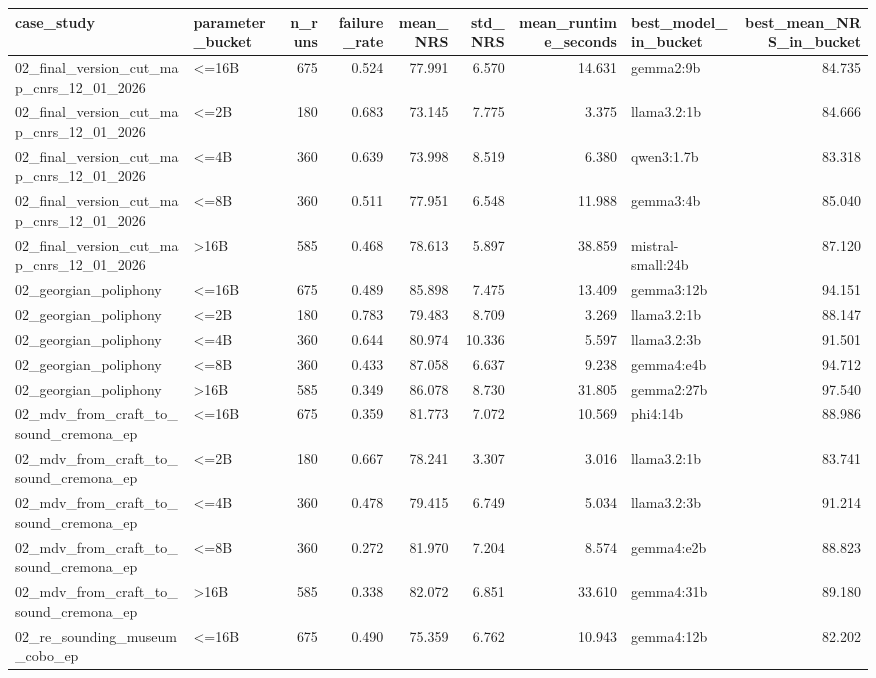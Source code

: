 \begin{tabular}{llrrrrrlr}
\toprule
case\_study & parameter\_bucket & n\_runs & failure\_rate & mean\_NRS & std\_NRS & mean\_runtime\_seconds & best\_model\_in\_bucket & best\_mean\_NRS\_in\_bucket \\
\midrule
02\_final\_version\_cut\_map\_cnrs\_12\_01\_2026 & <=16B & 675 & 0.524 & 77.991 & 6.570 & 14.631 & gemma2:9b & 84.735 \\
02\_final\_version\_cut\_map\_cnrs\_12\_01\_2026 & <=2B & 180 & 0.683 & 73.145 & 7.775 & 3.375 & llama3.2:1b & 84.666 \\
02\_final\_version\_cut\_map\_cnrs\_12\_01\_2026 & <=4B & 360 & 0.639 & 73.998 & 8.519 & 6.380 & qwen3:1.7b & 83.318 \\
02\_final\_version\_cut\_map\_cnrs\_12\_01\_2026 & <=8B & 360 & 0.511 & 77.951 & 6.548 & 11.988 & gemma3:4b & 85.040 \\
02\_final\_version\_cut\_map\_cnrs\_12\_01\_2026 & >16B & 585 & 0.468 & 78.613 & 5.897 & 38.859 & mistral-small:24b & 87.120 \\
02\_georgian\_poliphony & <=16B & 675 & 0.489 & 85.898 & 7.475 & 13.409 & gemma3:12b & 94.151 \\
02\_georgian\_poliphony & <=2B & 180 & 0.783 & 79.483 & 8.709 & 3.269 & llama3.2:1b & 88.147 \\
02\_georgian\_poliphony & <=4B & 360 & 0.644 & 80.974 & 10.336 & 5.597 & llama3.2:3b & 91.501 \\
02\_georgian\_poliphony & <=8B & 360 & 0.433 & 87.058 & 6.637 & 9.238 & gemma4:e4b & 94.712 \\
02\_georgian\_poliphony & >16B & 585 & 0.349 & 86.078 & 8.730 & 31.805 & gemma2:27b & 97.540 \\
02\_mdv\_from\_craft\_to\_sound\_cremona\_ep & <=16B & 675 & 0.359 & 81.773 & 7.072 & 10.569 & phi4:14b & 88.986 \\
02\_mdv\_from\_craft\_to\_sound\_cremona\_ep & <=2B & 180 & 0.667 & 78.241 & 3.307 & 3.016 & llama3.2:1b & 83.741 \\
02\_mdv\_from\_craft\_to\_sound\_cremona\_ep & <=4B & 360 & 0.478 & 79.415 & 6.749 & 5.034 & llama3.2:3b & 91.214 \\
02\_mdv\_from\_craft\_to\_sound\_cremona\_ep & <=8B & 360 & 0.272 & 81.970 & 7.204 & 8.574 & gemma4:e2b & 88.823 \\
02\_mdv\_from\_craft\_to\_sound\_cremona\_ep & >16B & 585 & 0.338 & 82.072 & 6.851 & 33.610 & gemma4:31b & 89.180 \\
02\_re\_sounding\_museum\_cobo\_ep & <=16B & 675 & 0.490 & 75.359 & 6.762 & 10.943 & gemma4:12b & 82.202 \\

\end{tabular}
